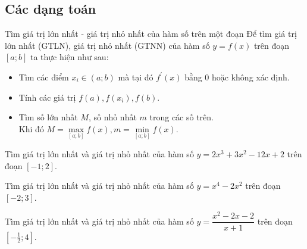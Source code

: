 \subsection{Các dạng toán}
\begin{dang}{Tìm giá trị lớn nhất - giá trị nhỏ nhất của hàm số trên một đoạn}
	Để tìm giá trị lớn nhất (GTLN), giá trị nhỏ nhất (GTNN) của hàm số $y=f(x)$ trên đoạn $\left[a;b\right]$ ta thực hiện như sau:
	\begin{itemize}
		\item Tìm các điểm $x_i\in (a;b)$ mà tại đó $f^\prime (x)$ bằng 0 hoặc không xác định.
		\item Tính các giá trị $f(a), f(x_i), f(b)$.
		\item Tìm số lớn nhất $M$, số nhỏ nhất $m$ trong các số trên.\\ Khi đó $M=\max\limits_{\left[a;b\right]}f(x), m=\min\limits_{\left[a;b\right]}f(x)$. 
	\end{itemize}
\end{dang}
\begin{vd}%
	Tìm giá trị lớn nhất và giá trị nhỏ nhất của hàm số $y=2x^3+3x^2-12x+2$ trên đoạn $[-1;2]$.
\end{vd}

\begin{vd}%
	Tìm giá trị lớn nhất và giá trị nhỏ nhất của hàm số $y=x^4-2x^2$ trên đoạn $[-2;3]$.
\end{vd}

\begin{vd}%
	Tìm giá trị lớn nhất và giá trị nhỏ nhất của hàm số $y=\dfrac{x^2-2x-2}{x+1}$ trên đoạn $\left[-\frac{1}{2};4\right]$.
\end{vd}

